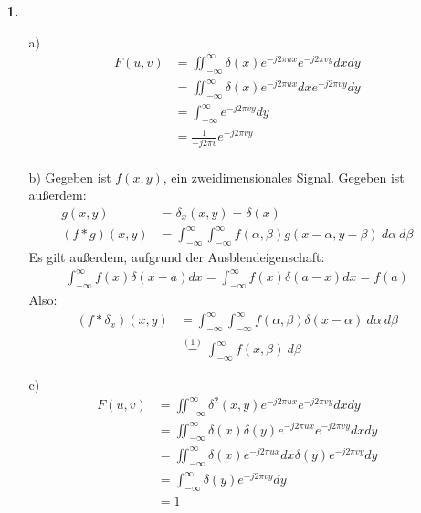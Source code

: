 \documentclass[a4paper,11pt]{article}
\author{\authorinfotitle}
\title{\titleinfo}
\date{\today}
\begin{document}
	\maketitle
	\begin{enumerate}
		\item[\textbf{1.}]
			\begin{enumerate}
				\item[a)]
					\begin{align*}
					F(u,v) &= \iint_{-\infty}^{\infty}\delta(x)e^{-j2\pi ux}e^{-j2\pi vy}dx dy\\
					&=\iint_{-\infty}^{\infty}\delta(x)e^{-j2\pi ux}dx e^{-j2\pi vy}dy\\
					&=\int_{-\infty}^{\infty} e^{-j2\pi vy}dy\\
					&= \frac{1}{-j2\pi v} e^{-j2\pi vy}\\
					\end{align*}
				\item[b)]
					Gegeben ist $f(x, y)$, ein zweidimensionales Signal. Gegeben ist außerdem:
					\begin{align*}
						g(x, y) &= \delta_x(x, y) = \delta(x) \\
						(f * g)(x, y) &= \int_{-\infty}^{\infty} \int_{-\infty}^{\infty} f(\alpha, \beta) g(x - \alpha, y - \beta) \ d\alpha \ d\beta
					\end{align*}
					Es gilt außerdem, aufgrund der Ausblendeigenschaft:
					\begin{align}
						\int_{-\infty}^{\infty} f(x) \delta(x - a) dx = \int_{-\infty}^{\infty} f(x) \delta(a - x) dx = f(a)
					\end{align}
					Also:
					\begin{align*}
						(f * \delta_x)(x, y) &= \int_{-\infty}^{\infty} \int_{-\infty}^{\infty} f(\alpha, \beta) \delta(x - \alpha) \ d\alpha \ d\beta \\
						 &\overset{(1)}{=} \int_{-\infty}^{\infty} f(x, \beta) \ d\beta
					\end{align*}
				\item[c)]
					\begin{align*}
					F(u,v) &= \iint_{-\infty}^{\infty}\delta^2(x,y)e^{-j2\pi ux}e^{-j2\pi vy}dx dy\\
					&= \iint_{-\infty}^{\infty}\delta(x)\delta(y)e^{-j2\pi ux}e^{-j2\pi vy}dx dy\\
					&=\iint_{-\infty}^{\infty}\delta(x)e^{-j2\pi ux}dx \delta(y)e^{-j2\pi vy}dy\\
					&=\int_{-\infty}^{\infty} \delta(y)e^{-j2\pi vy}dy\\
					&= 1\\
					\end{align*}
			\end{enumerate}
	\end{enumerate}
\end{document}
